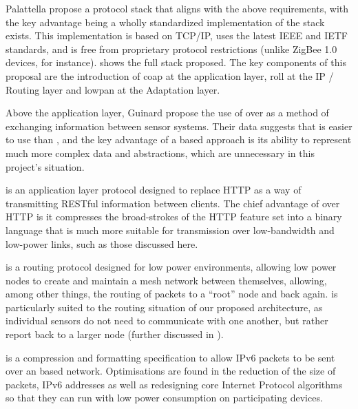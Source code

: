 Palattella \etal \cite{palattella2013standardized} propose a protocol stack that aligns with the above requirements, with the key advantage being a wholly standardized implementation of the stack exists. This implementation is based on TCP/IP, uses the latest IEEE and IETF \iot standards, and is free from proprietary protocol restrictions (unlike ZigBee 1.0 devices, for instance).  shows the full stack proposed. The key components of this proposal are the introduction of \acs{coap} at the application layer, \acs{roll} at the IP / Routing layer and \acs{lowpan} at the Adaptation layer.

Above the application layer, Guinard \etal \cite{guinard2012search} propose the use of \rest over \ws as a method of exchanging information between sensor systems. Their data suggests that \rest is easier to use than \ws, and the key advantage of a \ws based approach is its ability to represent much more complex data and abstractions, which are unnecessary in this project's situation.

\coap \cite{kovatsch2013coap} is an application layer protocol designed to replace HTTP as a way of transmitting RESTful information between clients. The chief advantage of \coap over HTTP is it compresses the broad-strokes of the HTTP feature set into a binary language that is much more suitable for transmission over low-bandwidth and low-power links, such as those discussed here.

\roll \cite{rfc6550} is a routing protocol designed for low power environments, allowing low power nodes to create and maintain a mesh network between themselves, allowing, among other things, the routing of packets to a ``root'' node and back again. \roll is particularly suited to the routing situation of our proposed architecture, as individual sensors do not need to communicate with one another, but rather report back to a larger node (further discussed in ).

\lowpan \cite{shelby20116lowpan} is a compression and formatting specification to allow IPv6 packets to be sent over an \lwifi based network. Optimisations are found in the reduction of the size of \lowpan packets, IPv6 addresses as well as redesigning core Internet Protocol algorithms so that they can run with low power consumption on participating devices.

